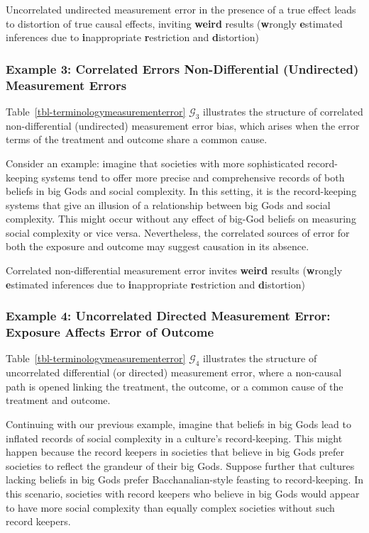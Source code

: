 \documentclass[
  single column]{article}
\begin{document}
Uncorrelated undirected measurement error in the presence of a true
effect leads to distortion of true causal effects, inviting
\textbf{weird} results (\textbf{w}rongly \textbf{e}stimated inferences
due to \textbf{i}nappropriate \textbf{r}estriction and
\textbf{d}istortion)

\subsubsection{Example 3: Correlated Errors Non-Differential
(Undirected) Measurement
Errors}\label{example-3-correlated-errors-non-differential-undirected-measurement-errors}

Table~\ref{tbl-terminologymeasurementerror} \(\mathcal{G}_3\)
illustrates the structure of correlated non-differential (undirected)
measurement error bias, which arises when the error terms of the
treatment and outcome share a common cause.

Consider an example: imagine that societies with more sophisticated
record-keeping systems tend to offer more precise and comprehensive
records of both beliefs in big Gods and social complexity. In this
setting, it is the record-keeping systems that give an illusion of a
relationship between big Gods and social complexity. This might occur
without any effect of big-God beliefs on measuring social complexity or
vice versa. Nevertheless, the correlated sources of error for both the
exposure and outcome may suggest causation in its absence.

Correlated non-differential measurement error invites \textbf{weird}
results (\textbf{w}rongly \textbf{e}stimated inferences due to
\textbf{i}nappropriate \textbf{r}estriction and \textbf{d}istortion)

\subsubsection{Example 4: Uncorrelated Directed Measurement Error:
Exposure Affects Error of
Outcome}\label{example-4-uncorrelated-directed-measurement-error-exposure-affects-error-of-outcome}

Table~\ref{tbl-terminologymeasurementerror} \(\mathcal{G}_4\)
illustrates the structure of uncorrelated differential (or directed)
measurement error, where a non-causal path is opened linking the
treatment, the outcome, or a common cause of the treatment and outcome.

Continuing with our previous example, imagine that beliefs in big Gods
lead to inflated records of social complexity in a culture's
record-keeping. This might happen because the record keepers in
societies that believe in big Gods prefer societies to reflect the
grandeur of their big Gods. Suppose further that cultures lacking
beliefs in big Gods prefer Bacchanalian-style feasting to
record-keeping. In this scenario, societies with record keepers who
believe in big Gods would appear to have more social complexity than
equally complex societies without such record keepers.
\end{document}

